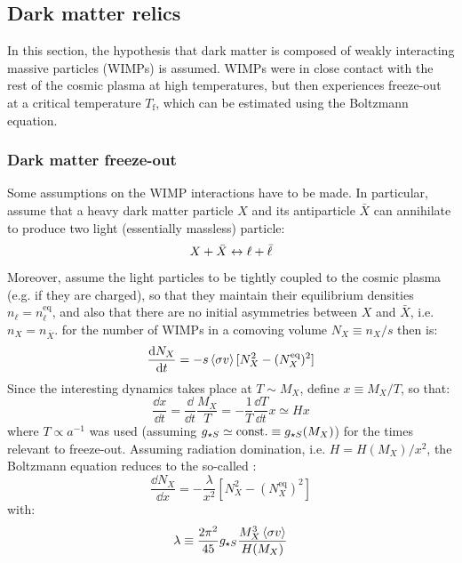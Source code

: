 \subsection{Dark matter relics}

In this section, the hypothesis that dark matter is composed of weakly interacting massive particles (WIMPs) is assumed. WIMPs were in close contact with the rest of the cosmic plasma at high temperatures, but then experiences freeze-out at a critical temperature $ T_\text{f} $, which can be estimated using the Boltzmann equation.

\subsubsection{Dark matter freeze-out}

Some assumptions on the WIMP interactions have to be made. In particular, assume that a heavy dark matter particle $ X $ and its antiparticle $ \bar{X} $ can annihilate to produce two light (essentially massless) particle:
\begin{equation*}
  X + \bar{X} \leftrightarrow \ell + \bar{\ell}
\end{equation*}
Moreover, assume the light particles to be tightly coupled to the cosmic plasma (e.g. if they are charged), so that they maintain their equilibrium densities $ n_\ell = n_\ell^\text{eq} $, and also that there are no initial asymmetries between $ X $ and $ \bar{X} $, i.e. $ n_X = n_{\bar{X}} $.  for the number of WIMPs in a comoving volume $ N_X \equiv n_X / s $ then is:
\begin{equation*}
  \frac{\mathrm{d} N_X}{\mathrm{d} t} = - s \braket{\sigma v} [N_X^2 - (N_X^\text{eq})^2]
\end{equation*}
Since the interesting dynamics takes place at $ T \sim M_X $, define $ x \equiv M_X / T $, so that:
\begin{equation*}
  \frac{\dd x}{\dd t} = \frac{\dd}{\dd t} \frac{M_X}{T} = - \frac{1}{T} \frac{\dd T}{\dd t} x \simeq H x
\end{equation*}
where $ T \propto a^{-1} $ was used (assuming $ g_{\star S} \simeq \text{const.} \equiv g_{\star S}(M_X) $) for the times relevant to freeze-out. Assuming radiation domination\footnotemark, i.e. $ H = H(M_X) / x^2 $, the Boltzmann equation reduces to the so-called :
\begin{equation}
  \frac{\dd N_X}{\dd x} = - \frac{\lambda}{x^2} [N_X^2 - (N_X^\text{eq})^2]
\end{equation}
with:
\begin{equation}
  \lambda \equiv \frac{2\pi^2}{45} g_{\star S} \frac{M_X^3 \braket{\sigma v}}{H(M_X)}
\end{equation}

